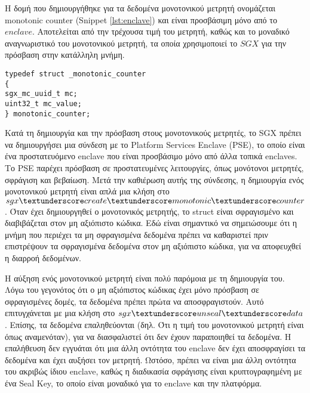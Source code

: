 \vspace{0.8cm}

Η δομή που δημιουργήθηκε για τα δεδομένα μονοτονικού μετρητή ονομάζεται monotonic counter (Snippet \ref{lst:enclave}) και είναι προσβάσιμη μόνο από το $enclave$. Αποτελείται από την τρέχουσα τιμή του μετρητή, καθώς και το μοναδικό αναγνωριστικό του μονοτονικού μετρητή, τα οποία χρησιμοποιεί το $SGX$ για την πρόσβαση στην κατάλληλη μνήμη.

\vspace{0.8cm}

\begin{minipage}{\linewidth}
\begin{lstlisting}[caption={H δομή monotonic\textunderscore counter στο Enclave.cpp },captionpos=b,frame=single,label={lst:monotonic_struct}]  
typedef struct _monotonic_counter
{
sgx_mc_uuid_t mc;
uint32_t mc_value;
} monotonic_counter;
\end{lstlisting}
\end{minipage}

\vspace{0.8cm}

Κατά τη δημιουργία και την πρόσβαση στους μονοτονικούς μετρητές, το SGX πρέπει να δημιουργήσει μια σύνδεση με το Platform Services Enclave (PSE), το οποίο είναι ένα προστατευόμενο enclave που είναι προσβάσιμο μόνο από άλλα τοπικά enclaves. Το PSE παρέχει πρόσβαση σε προστατευμένες λειτουργίες, όπως μονότονοι μετρητές, σφράγιση και βεβαίωση. Μετά την καθιέρωση αυτής της σύνδεσης, η δημιουργία ενός μονοτονικού μετρητή είναι απλά μια κλήση στο $sgx\textunderscore create\textunderscore monotonic\textunderscore counter$. Όταν έχει δημιουργηθεί ο μονοτονικός μετρητής, το struct είναι σφραγισμένο και διαβιβάζεται στον μη αξιόπιστο κώδικα. Εδώ είναι σημαντικό να σημειώσουμε ότι η μνήμη που περιέχει τα μη σφραγισμένα δεδομένα πρέπει να καθαριστεί πριν επιστρέψουν τα σφραγισμένα δεδομένα στον μη αξιόπιστο κώδικα, για να αποφευχθεί η διαρροή δεδομένων.

Η αύξηση ενός μονοτονικού μετρητή είναι πολύ παρόμοια με τη δημιουργία του. Λόγω του γεγονότος ότι ο μη αξιόπιστος κώδικας έχει μόνο πρόσβαση σε σφραγισμένες δομές, τα δεδομένα πρέπει πρώτα να αποσφραγιστούν. Αυτό επιτυγχάνεται με μια κλήση στο $sgx\textunderscore unseal \textunderscore data$. Επίσης, τα δεδομένα επαληθεύονται (δηλ. Ότι η τιμή του μονοτονικού μετρητή είναι όπως αναμενόταν), για να διασφαλιστεί ότι δεν έχουν παραποιηθεί τα δεδομένα. Η επαλήθευση δεν εγγυάται ότι μια άλλη οντότητα του enclave δεν έχει αποσφραγίσει τα δεδομένα και έχει αυξήσει τον μετρητή. Ωστόσο, πρέπει να είναι μια άλλη οντότητα του ακριβώς ίδιου enclave, καθώς η διαδικασία σφράγισης είναι κρυπτογραφημένη με ένα Seal Key, το οποίο είναι μοναδικό για το enclave και την πλατφόρμα\cite{linuxsgxguide}.

